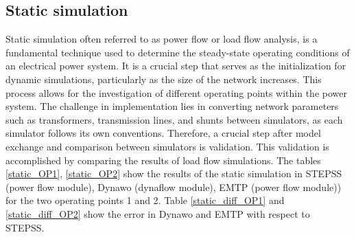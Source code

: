 \documentclass{report}
\begin{document}
\subsection{Static simulation}
Static simulation often referred to as power flow or load flow analysis, is a fundamental technique used to determine the steady-state operating conditions of an electrical power system. It is a crucial step that serves as the initialization for dynamic simulations, particularly as the size of the network increases. This process allows for the investigation of different operating points within the power system. The challenge in implementation lies in converting network parameters such as transformers, transmission lines, and shunts between simulators, as each simulator follows its own conventions. Therefore, a crucial step after model exchange and comparison between simulators is validation. This validation is accomplished by comparing the results of load flow simulations. The tables \ref{static_OP1},  \ref{static_OP2} show the results of the static simulation in STEPSS (power flow module), Dynawo (dynaflow module), EMTP (power flow module)) for the two operating points 1 and 2. Table \ref{static_diff_OP1} and \ref{static_diff_OP2} show the error in Dynawo and EMTP with respect to STEPSS.
\end{document}
